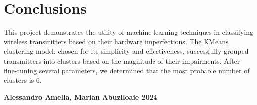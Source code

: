 \documentclass{article}
\begin{document}
\section{Conclusions}
This project demonstrates the utility of machine learning techniques in classifying wireless transmitters based on their hardware imperfections. The KMeans clustering model, chosen for its simplicity and effectiveness, successfully grouped transmitters into clusters based on the magnitude of their impairments. After fine-tuning several parameters, we determined that the most probable number of clusters is 6.


\appendix

\vspace*{\fill}

\hrulefill
\vspace{1em}

\textbf{Alessandro Amella, Marian Abuziloaie \textcopyright{} 2024}
\end{document}
